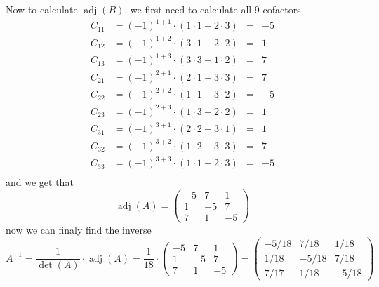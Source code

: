 \documentclass{article}
\newcommand*{\mat}[1]{\begin{pmatrix}#1\end{pmatrix}}
\DeclareMathOperator{\adj}{adj}
\begin{document}
\begin{enumerate}
{\begin{enumerate}
{                    Now to calculate \(\adj(B)\), we first need to calculate all 9 cofactors
                    \begin{displaymath}
                        \begin{aligned}
                            C_{11} &= (-1)^{1+1} \cdot \left(1\cdot1 - 2\cdot3\right) &=& -5 \\
                            C_{12} &= (-1)^{1+2} \cdot \left(3\cdot1 - 2\cdot2\right) &=& 1 \\
                            C_{13} &= (-1)^{1+3} \cdot \left(3\cdot3 - 1\cdot2\right) &=& 7 \\
                            C_{21} &= (-1)^{2+1} \cdot \left(2\cdot1 - 3\cdot3\right) &=& 7 \\
                            C_{22} &= (-1)^{2+2} \cdot \left(1\cdot1 - 3\cdot2\right) &=& -5 \\
                            C_{23} &= (-1)^{2+3} \cdot \left(1\cdot3 - 2\cdot2\right) &=& 1 \\
                            C_{31} &= (-1)^{3+1} \cdot \left(2\cdot2 - 3\cdot1\right) &=& 1 \\
                            C_{32} &= (-1)^{3+2} \cdot \left(1\cdot2 - 3\cdot3\right) &=& 7 \\
                            C_{33} &= (-1)^{3+3} \cdot \left(1\cdot1 - 2\cdot3\right) &=& -5 \\
                        \end{aligned}
                    \end{displaymath}
                    and we get that
                    \begin{displaymath}
                        \adj(A) = \mat{-5 & 7 & 1 \\ 1 & -5  & 7 \\ 7 & 1 & -5}
                    \end{displaymath}
                    now we can finaly find the inverse
                    \begin{displaymath}
                        A^{-1} = \frac{1}{\det(A)}\cdot\adj(A) = \frac{1}{18}\cdot\mat{-5 & 7 & 1 \\ 1 & -5  & 7 \\ 7 & 1 & -5} = \mat{-5/18 & 7/18 & 1/18 \\ 1/18 & -5/18 & 7/18 \\ 7/17 & 1/18 & -5/18}
                    \end{displaymath}
                }
            \end{enumerate}
        }
    \end{enumerate}
\end{document}
